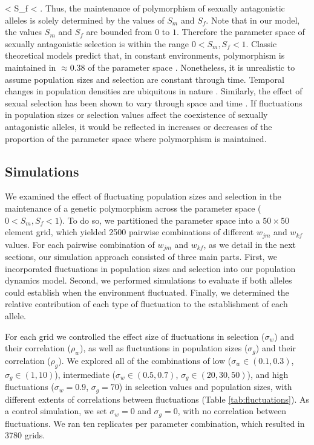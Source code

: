 \documentclass[12pt]{article}
\let\oldequation\equation
\let\oldendequation\endequation
\renewenvironment{equation}
  {\linenomathNonumbers\oldequation}
  {\oldendequation\endlinenomath}
\begin{document}
\begin{equation}
 < S_{f} < 
\label{selection}
\end{equation}
\citep{kidwell1977regions,pamilo1979genic,patten2010fitness,connallon_evolutionary_2018}. Thus, the maintenance of polymorphism of sexually antagonistic alleles is solely determined by the values of $S_{m}$ and $S_{f}$. Note that in our model, the values $S_{m}$ and $S_{f}$ are bounded from $0$ to $1$. Therefore the parameter space of sexually antagonistic selection is within the range $ 0< S_{m}, S_{f} < 1$. Classic theoretical models predict that, in constant environments, polymorphism is maintained in $\approx 0.38$ of the parameter space \citep{kidwell1977regions,pamilo1979genic,connallon_evolutionary_2018}. Nonetheless, it is unrealistic to assume population sizes and selection are constant through time. Temporal changes in population densities are ubiquitous in nature \citep{connallon2012general,reinhold2000maintenance}. Similarly, the effect of sexual selection has been shown to vary through space and time \citep{kasumovic2008spatial}. If fluctuations in population sizes or selection values affect the coexistence of sexually antagonistic alleles, it would be reflected in increases or decreases of the proportion of the parameter space where polymorphism is maintained.

\subsection*{Simulations}
We examined the effect of fluctuating population sizes and selection in the maintenance of a genetic polymorphism across the parameter space ($0 < S_{m}, S_{f} < 1$). To do so, we partitioned the parameter space into a $50 \times 50$ element grid, which yielded 2500 pairwise combinations of different $w_{jm}$ and $w_{kf}$ values. For each pairwise combination of $w_{jm}$ and $w_{kf}$, as we detail in the next sections, our simulation approach consisted of three main parts. First, we incorporated fluctuations in population sizes and selection into our population dynamics model. Second, we performed simulations to evaluate if both alleles could establish when the environment fluctuated. Finally, we determined the relative contribution of each type of fluctuation to the establishment of each allele.

For each grid we controlled the effect size of  fluctuations in selection ($\sigma_{w}$) and their correlation ($\rho_{w}$), as well as fluctuations in population sizes ($\sigma_{g}$) and their correlation ($\rho_{g}$). We explored all of  the combinations of low ($\sigma_{w}\in{(0.1, 0.3)}$, $\sigma_{g}\in{(1,10)}$), intermediate ($\sigma_{w}\in{(0.5, 0.7)}$, $\sigma_{g}\in{(20,30,50)}$), and high fluctuations ($\sigma_{w}= 0.9$, $\sigma_{g}=70$)  in selection values and population sizes, with different extents of correlations between fluctuations (Table \ref{tab:fluctuations}).  As a control simulation, we set $\sigma_{w}= 0$ and  $\sigma_{g}=0$, with no correlation between fluctuations. We ran ten replicates per parameter combination, which resulted in 3780 grids.
\end{document}

